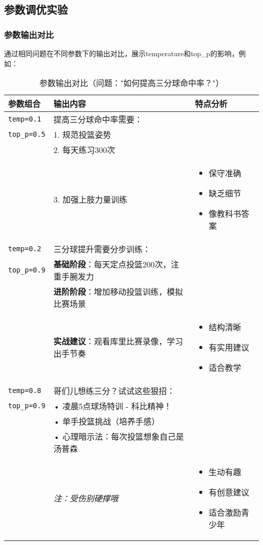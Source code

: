 \documentclass{article}
\theoremstyle{plain}
\theoremstyle{definition}
\theoremstyle{remark}
\begin{document}
\subsection{参数调优实验}

\subsubsection{参数输出对比}
通过相同问题在不同参数下的输出对比，展示temperature和top\_p的影响，例如：
\begin{table}[t]
\caption{参数输出对比（问题："如何提高三分球命中率？"）}
\label{output-comparison}
\begin{center}
\renewcommand{\arraystretch}{0.8} %
\setlength{\tabcolsep}{3pt} %
\begin{tabular}{p{2cm}|p{4.5cm}|p{3cm}}
\toprule
\textbf{参数组合} & \textbf{输出内容} & \textbf{特点分析} \\
\midrule
\texttt{temp=0.1} & 提高三分球命中率需要：\\
\texttt{top\_p=0.5} & 1. 规范投篮姿势\\
 & 2. 每天练习300次\\
 & 3. 加强上肢力量训练 & \begin{itemize}
   \item 保守准确
   \item 缺乏细节
   \item 像教科书答案
 \end{itemize} \\
\hline
\texttt{temp=0.2} & 三分球提升需要分步训练：\\
\texttt{top\_p=0.9} & \textbf{基础阶段}：每天定点投篮200次，注重手腕发力\\
 & \textbf{进阶阶段}：增加移动投篮训练，模拟比赛场景\\
 & \textbf{实战建议}：观看库里比赛录像，学习出手节奏 & \begin{itemize}
   \item 结构清晰
   \item 有实用建议
   \item 适合教学
 \end{itemize} \\
\hline
\texttt{temp=0.8} & 哥们儿想练三分？试试这些狠招：\\
\texttt{top\_p=0.9} & • 凌晨5点球场特训 - 科比精神！\\
 & • 单手投篮挑战（培养手感）\\
 & • 心理暗示法：每次投篮想象自己是汤普森\\
 & \textit{注：受伤别硬撑哦~} & \begin{itemize}
   \item 生动有趣
   \item 有创意建议
   \item 适合激励青少年
 \end{itemize} \\
\bottomrule
\end{tabular}
\end{center}
\end{table}
\end{document}
